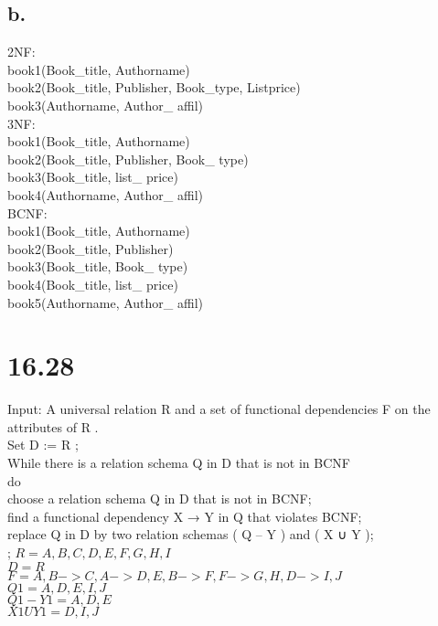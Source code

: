 \documentclass[11pt]{article}
\theoremstyle{plain}
\theoremstyle{definition}
\begin{document}
\subsection*{b.}
2NF:\\
    book1(Book\_title, Authorname)\\
    book2(Book\_title, Publisher, Book\_type, Listprice)\\
    book3(Authorname, Author\_ affil)\\
    3NF:\\
    book1(Book\_title, Authorname)\\
    book2(Book\_title, Publisher, Book\_ type)\\
    book3(Book\_title, list\_ price)\\
    book4(Authorname, Author\_ affil)\\
    BCNF:\\
book1(Book\_title, Authorname)\\
    book2(Book\_title, Publisher)\\
book3(Book\_title, Book\_ type)\\
    book4(Book\_title, list\_ price)\\
    book5(Authorname, Author\_ affil)\\
\section*{16.28}
Input: A universal relation R and a set of functional dependencies F on the attributes of R .\\
Set D := { R } ; \\
While there is a relation schema Q in D that is not in BCNF \\
do \\
{ 
choose a relation schema Q in D that is not in BCNF; \\
find a functional dependency X → Y in Q that violates BCNF;\\
replace Q in D by two relation schemas ( Q – Y ) and ( X ∪ Y ); \\
} ;
$R = {A, B, C, D, E, F, G, H, I} $\\
$D= R$\\
$F = { {A, B} -> {C}, {A} -> {D, E}, {B} -> {F}, {F} ->{G, H}, {D} -> {I, J} }$\\

$Q1 = {A,D,E,I,J}$\\
$Q1-Y1 = {A,D,E}$\\
$X1 U Y1 = {D,I,J}$\\
\end{document}
